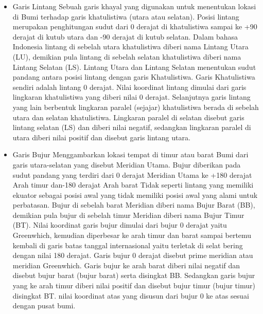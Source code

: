 \begin{enumerate}
\begin{itemize}
\item Garis Lintang 
Sebuah garis khayal yang digunakan untuk menentukan lokasi di Bumi terhadap garis khatulistiwa (utara atau selatan).  Posisi lintang merupakan penghitungan sudut dari 0 derajat di khatulistiwa sampai ke +90 derajat di kutub utara dan -90 derajat di kutub selatan.  Dalam bahasa Indonesia lintang di sebelah utara khatulistiwa diberi nama Lintang Utara (LU), demikian pula lintang di sebelah selatan khatulistiwa diberi nama Lintang Selatan (LS).  Lintang Utara dan Lintang Selatan menentukan sudut pandang antara posisi lintang dengan garis Khatulistiwa.  Garis Khatulistiwa sendiri adalah lintang 0 derajat.  Nilai koordinat lintang dimulai dari garis lingkaran khatulistiwa yang diberi nilai 0 derajat.  Selanjutnya garis lintang yang lain berbentuk lingkaran paralel (sejajar) khatulistiwa berada di sebelah utara dan selatan khatulistiwa.  Lingkaran paralel di selatan disebut garis lintang selatan (LS) dan diberi nilai negatif, sedangkan lingkaran paralel di utara diberi nilai positif dan disebut garis lintang utara.
\item Garis Bujur
Menggambarkan lokasi tempat di timur atau barat Bumi dari garis utara-selatan yang disebut Meridian Utama.  Bujur diberikan pada sudut pandang yang terdiri dari 0 derajat Meridian Utama ke +180 derajat Arah timur dan-180 derajat Arah barat Tidak seperti lintang yang memiliki ekuator sebagai posisi awal yang tidak memiliki posisi awal yang alami untuk perbatasan.  Bujur di sebelah barat Meridian diberi nama Bujur Barat (BB), demikian pula bujur di sebelah timur Meridian diberi nama Bujur Timur (BT).  Nilai koordinat garis bujur dimulai dari bujur 0 derajat yaitu Greenwhich, kemudian diperbesar ke arah timur dan barat sampai bertemu kembali di garis batas tanggal internasional yaitu terletak di selat bering dengan nilai 180 derajat.  Garis bujur 0 derajat disebut prime meridian atau meridian Greenwhich.  Garis bujur ke arah barat diberi nilai negatif dan disebut bujur barat (bujur barat) serta disingkat BB.  Sedangkan garis bujur yang ke arah timur diberi nilai positif dan disebut bujur timur (bujur timur) disingkat BT.  nilai koordinat atas yang disusun dari bujur 0 ke atas sesuai dengan pusat bumi.
\end{itemize}

\end{enumerate}
